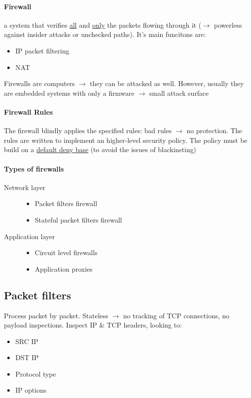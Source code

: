 \documentclass{article}
\begin{document}
\paragraph{Firewall} a system that verifies \underline{all} and \underline{only} the packets flowing through it ($\rightarrow$ powerless against insider attacks or unchecked paths). It's main funcitons are:
\begin{itemize}
\item IP packet filtering
\item NAT
\end{itemize}
Firewalls are computers $\rightarrow$ they can be attacked as well. However, usually they are embedded systems with only a firmware $\rightarrow$ small attack surface
\paragraph{Firewall Rules} The firewall blindly applies the specified rules: bad rules $\rightarrow$ no protection. The rules are written to implement an higher-level security policy. The policy must be build on a \underline{default deny base} (to avoid the issues of blackinsting)
\paragraph{Types of firewalls}
\begin{description}
\item[Network layer] 
	\begin{itemize}
	\item Packet filters firewall
	\item Stateful packet filters firewall
	\end{itemize}
\item[Application layer]
	\begin{itemize}
	\item Circuit level firewalls
	\item Application proxies
	\end{itemize}
\end{description}

\subsection{Packet filters} 
Process packet by packet. Stateless $\rightarrow$ no tracking of TCP connections, no payload inspections. Inspect IP \& TCP headers, looking to:
\begin{itemize}
\item SRC IP
\item DST IP
\item Protocol type
\item IP options
\end{itemize}
\end{document}
